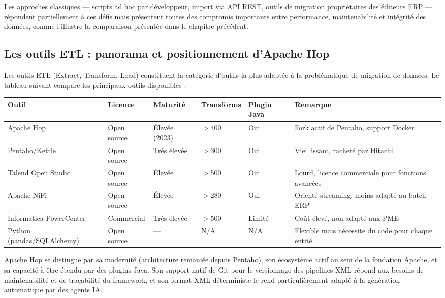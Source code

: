 \documentclass[a4paper,12pt]{article}
\begin{document}
Les approches classiques — scripts ad hoc par développeur, import via API REST, outils de migration propriétaires des éditeurs ERP — répondent partiellement à ces défis mais présentent toutes des compromis importants entre performance, maintenabilité et intégrité des données, comme l'illustre la comparaison présentée dans le chapitre précédent.

\subsection{Les outils ETL : panorama et positionnement d'Apache Hop}

Les outils ETL (Extract, Transform, Load) constituent la catégorie d'outils la plus adaptée à la problématique de migration de données. Le tableau suivant compare les principaux outils disponibles :

\begin{center}
\begin{tabular}{|p{}|p{}|p{}|p{}|p{}|p{}|}
\hline
\textbf{Outil} & \textbf{Licence} & \textbf{Maturité} & \textbf{Transforms} & \textbf{Plugin Java} & \textbf{Remarque} \\
\hline
Apache Hop & Open source & Élevée (2023) & $>$400 & Oui & Fork actif de Pentaho, support Docker \\
\hline
Pentaho/Kettle & Open source & Très élevée & $>$300 & Oui & Vieillissant, racheté par Hitachi \\
\hline
Talend Open Studio & Open source & Élevée & $>$500 & Oui & Lourd, licence commerciale pour fonctions avancées \\
\hline
Apache NiFi & Open source & Élevée & $>$280 & Oui & Orienté streaming, moins adapté au batch ERP \\
\hline
Informatica PowerCenter & Commercial & Très élevée & $>$500 & Limité & Coût élevé, non adapté aux PME \\
\hline
Python (pandas/SQLAlchemy) & Open source & --- & N/A & N/A & Flexible mais nécessite du code pour chaque entité \\
\hline
\end{tabular}
\end{center}

Apache Hop se distingue par sa modernité (architecture remaniée depuis Pentaho), son écosystème actif au sein de la fondation Apache, et sa capacité à être étendu par des plugins Java. Son support natif de Git pour le versionnage des pipelines XML répond aux besoins de maintenabilité et de traçabilité du framework, et son format XML déterministe le rend particulièrement adapté à la génération automatique par des agents IA.
\end{document}
